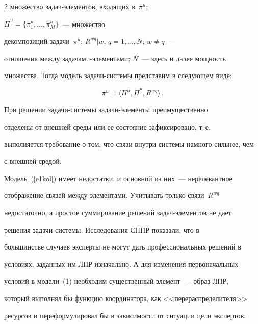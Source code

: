 \begin{multicols}{2}
множество за\-дач-эле\-мен\-тов, входящих в~$\pi^u$;\linebreak 


$\dot{\Pi}^u=\{\dot{\pi}_1^u,\ldots , \dot{\pi}^u_M\}$~--- множество 


декомпозиций задачи~$\pi^u$; $R^{wq}\vert w$, $q=1,\ldots ,N$; $w\not=q$~--- 


отношения между задачами-элементами; $N$~--- здесь и далее мощность 


множества. Тогда модель задачи-сис\-те\-мы представим в следующем виде:


  \begin{equation}


\pi^u =\langle \Pi^h, \dot{\Pi}^u, R^{wq}\rangle\,.


\label{e1kol}


\end{equation}


  


  При решении задачи-системы за\-да\-чи-эле\-мен\-ты преимущественно 


отделены от внешней среды или ее состояние зафиксировано, т.\,е.\ 


выполняется требование о том, что связи внутри системы намного сильнее, чем 


с внешней средой.


  





  


  Модель~(\ref{e1kol}) имеет недостатки, и основной из них~--- нерелевантное 


отображение связей между элементами. Учитывать только связи~$R^{wq}$ 


недостаточно, а простое суммирование решений за\-дач-эле\-мен\-тов не дает 


решения за\-да\-чи-сис\-те\-мы. Исследования СППР показали, что в 


большинстве случаев эксперты не могут дать профессиональных решений в 


условиях, заданных им ЛПР изначально. А для изменения первоначальных 


условий в модели~(1) необходим существенный элемент~--- образ ЛПР, 


который выполнял бы функцию координатора, как <<перераспределителя>> 


ресурсов и переформулировал бы в зависимости от ситуации цели экспертов. 



\end{multicols}
